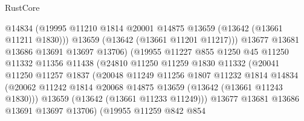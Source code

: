\begin{lexlean}{RustCore}
\begin{coremodule}
                                  @14834
                                  (@19995
                                    @11210
                                    @1814
                                    @20001
                                    @14875
                                    @13659
                                    (@13642 (@13661 @11211 @1830)))
                                  @13659
                                  (@13642 (@13661 @11201 @11217)))
                                @13677
                                @13681
                                @13686
                                @13691
                                @13697
                                @13706)
                              (@19955
                                @11227
                                @855
                                @1250
                                @45
                                @11250
                                @11332
                                @11356
                                @11438
                                (@24810
                                  @11250
                                  @11259
                                  @1830
                                  @11332
                                  (@20041
                                    @11250
                                    @11257
                                    @1837
                                    (@20048
                                      @11249
                                      @11256
                                      @1807
                                      @11232
                                      @1814
                                      @14834
                                      (@20062
                                        @11242
                                        @1814
                                        @20068
                                        @14875
                                        @13659
                                        (@13642 (@13661 @11243 @1830)))
                                      @13659
                                      (@13642 (@13661 @11233 @11249)))
                                    @13677
                                    @13681
                                    @13686
                                    @13691
                                    @13697
                                    @13706)
                                  (@19955
                                    @11259
                                    @842
                                    @854

\end{coremodule}
\end{lexlean}
